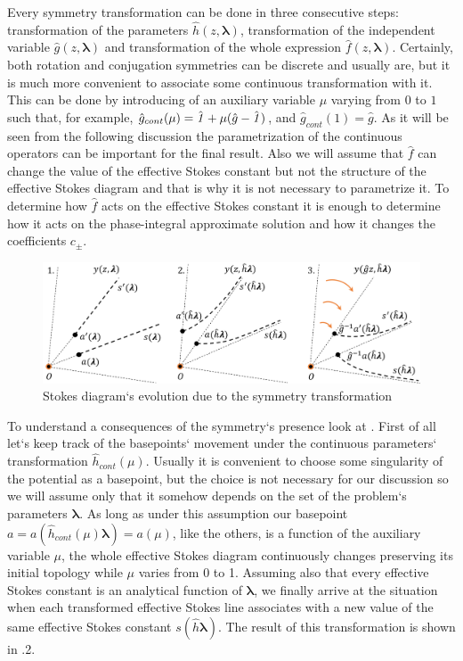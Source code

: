 \documentclass[12pt]{iopart}
\def\f{\hat{f}}
\def\g{\hat{g}}
\def\h{\hat{h}}
\def\lmbd{\bm{\lambda}}
\def\unity{\hat{\it 1}}
\begin{document}
Every symmetry transformation can be done in three consecutive steps: transformation 
of the parameters $\h(z,\lmbd)$, transformation of the independent variable $\g(z,\lmbd)$ and 
transformation of the whole expression $\f(z,\lmbd)$. 
Certainly, both rotation and conjugation symmetries can be discrete and 
usually are, but it is much more convenient to associate some continuous transformation 
with it. This can be done by introducing of an auxiliary variable $\mu$ varying from $0$ 
to $1$ such that, for example, $\g_{cont}(\mu)=\unity+\mu (\g-\unity)$, and $\g_{cont}(1)=\g$. 
As it will be seen from the following discussion the parametrization of the 
continuous operators can be important for the final result. Also we will assume that $\f$ can 
change the value of the effective Stokes constant but not the structure of the effective Stokes diagram and 
that is why it is not necessary to parametrize it. To determine how $\f$ acts on the 
effective Stokes constant it is enough to determine how it acts on the phase-integral approximate 
solution  and how it changes the coefficients $c_\pm$.

\begin{figure}
\centering
\noindent
\includegraphics[width=\textwidth]{stuff/rs.png}
\caption{Stokes diagram`s evolution due to the symmetry transformation}
\label{fig:rst}
\end{figure}

To understand a consequences of the symmetry`s presence look at . 
First of all let`s keep track of the basepoints` movement under the continuous parameters` 
transformation $\h_{cont}(\mu)$. Usually it is convenient to choose some singularity of the 
potential as a basepoint, but the choice is not necessary for our discussion so we will assume 
only that it somehow depends on the set of the problem`s parameters $\lmbd$. As long as under 
this assumption our basepoint $a=a(\h_{cont}(\mu)\lmbd)=a(\mu)$, like the others, is a function 
of the auxiliary variable $\mu$, the whole effective Stokes diagram continuously changes preserving its 
initial topology while $\mu$ varies from 0 to 1. Assuming also that every effective Stokes constant is 
an analytical function of $\lmbd$, we finally arrive at the situation when each transformed effective Stokes 
line associates with a new value of the same effective Stokes constant $s(\h\lmbd)$. The result of this 
transformation is shown in .2. 
\end{document}
